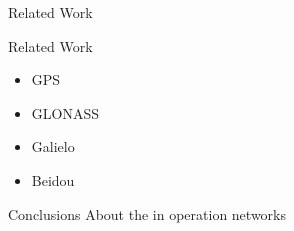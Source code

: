 %
%
%
%
%

%
%
%
%
%


\begin{frame}{Related Work}

\end{frame}

\begin{frame}{Related Work}

    \begin{itemize}
        \item GPS
        \item GLONASS
        \item Galielo
        \item Beidou
    \end{itemize}

\end{frame}

\begin{frame}{Conclusions About the in operation networks}

\end{frame}
